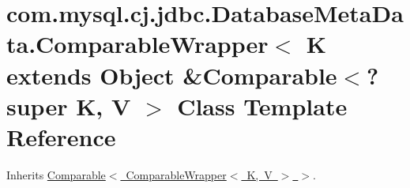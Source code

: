 \hypertarget{classcom_1_1mysql_1_1cj_1_1jdbc_1_1_database_meta_data_1_1_comparable_wrapper}{}\section{com.\+mysql.\+cj.\+jdbc.\+Database\+Meta\+Data.\+Comparable\+Wrapper$<$ K extends Object \&Comparable$<$? super K, V $>$ Class Template Reference}
\label{classcom_1_1mysql_1_1cj_1_1jdbc_1_1_database_meta_data_1_1_comparable_wrapper}


Inherits \mbox{\hyperlink{class_comparable}{Comparable$<$ Comparable\+Wrapper$<$ K, V $>$ $>$}}.

